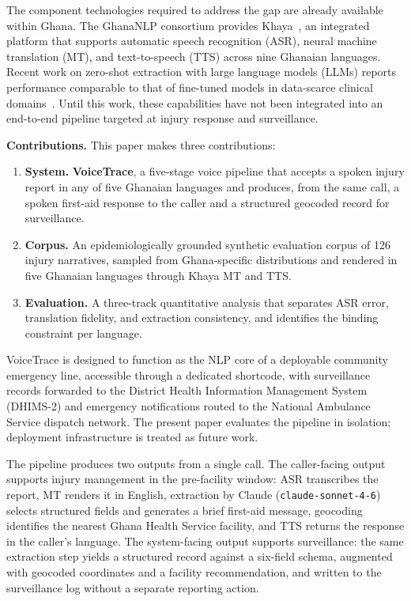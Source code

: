 \documentclass[conference]{IEEEtran}
\begin{document}
The component technologies required to address the gap are already
available within Ghana. The GhanaNLP consortium provides
Khaya~\cite{khaya}, an integrated platform that supports automatic
speech recognition (ASR), neural machine translation (MT), and
text-to-speech (TTS) across nine Ghanaian languages. Recent work on
zero-shot extraction with large language models (LLMs) reports
performance comparable to that of fine-tuned models in data-scarce
clinical domains~\cite{omiye2025,lorenzoni2024}. Until this work,
these capabilities have not been integrated into an end-to-end
pipeline targeted at injury response and surveillance.

\textbf{Contributions.} This paper makes three contributions:
\begin{enumerate}
  \item \textbf{System.} \textbf{VoiceTrace}, a five-stage voice
  pipeline that accepts a spoken injury report in any of five
  Ghanaian languages and produces, from the same call, a spoken
  first-aid response to the caller and a structured geocoded record
  for surveillance.
  \item \textbf{Corpus.} An epidemiologically grounded synthetic
  evaluation corpus of 126 injury narratives, sampled from
  Ghana-specific distributions and rendered in five Ghanaian
  languages through Khaya MT and TTS.
  \item \textbf{Evaluation.} A three-track quantitative analysis that
  separates ASR error, translation fidelity, and extraction
  consistency, and identifies the binding constraint per language.
\end{enumerate}

VoiceTrace is designed to function as the NLP core of a deployable
community emergency line, accessible through a dedicated shortcode,
with surveillance records forwarded to the District Health
Information Management System (DHIMS-2) and emergency notifications
routed to the National Ambulance Service dispatch network. The
present paper evaluates the pipeline in isolation; deployment
infrastructure is treated as future work.

The pipeline produces two outputs from a single call. The
caller-facing output supports injury management in the pre-facility
window: ASR transcribes the report, MT renders it in English,
extraction by Claude (\texttt{claude-sonnet-4-6}) selects structured
fields and generates a brief first-aid message, geocoding identifies
the nearest Ghana Health Service facility, and TTS returns the
response in the caller's language. The system-facing output supports
surveillance: the same extraction step yields a structured record
against a six-field schema, augmented with geocoded coordinates and
a facility recommendation, and written to the surveillance log
without a separate reporting action.
\end{document}
